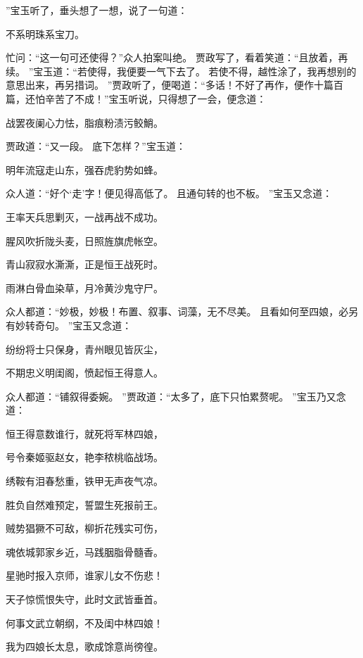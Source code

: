 ”宝玉听了，垂头想了一想，说了一句道：\par
\hop
不系明珠系宝刀。
\par
\hop
忙问：“这一句可还使得？”众人拍案叫绝。
贾政写了，看着笑道：“且放着，再续。
”宝玉道：“若使得，我便要一气下去了。
若使不得，越性涂了，我再想别的意思出来，再另措词。
”贾政听了，便喝道：“多话！不好了再作，便作十篇百篇，还怕辛苦了不成！”宝玉听说，只得想了一会，便念道：\par
\hop
战罢夜阑心力怯，脂痕粉渍污鲛鮹。
\par
\hop
贾政道：“又一段。
底下怎样？”宝玉道：\par
\hop
明年流寇走山东，强吞虎豹势如蜂。
\par
\hop
众人道：“好个‘走’字！便见得高低了。
且通句转的也不板。
”宝玉又念道：\par
\hop
王率天兵思剿灭，一战再战不成功。
\par
腥风吹折陇头麦，日照旌旗虎帐空。
\par
青山寂寂水澌澌，正是恒王战死时。
\par
雨淋白骨血染草，月冷黄沙鬼守尸。
\par
\hop
众人都道：“妙极，妙极！布置、叙事、词藻，无不尽美。
且看如何至四娘，必另有妙转奇句。
”宝玉又念道：\par
\hop
纷纷将士只保身，青州眼见皆灰尘，\par
不期忠义明闺阁，愤起恒王得意人。
\par
\hop
众人都道：“铺叙得委婉。
”贾政道：“太多了，底下只怕累赘呢。
”宝玉乃又念道：\par
\hop
恒王得意数谁行，就死将军林四娘，\par
号令秦姬驱赵女，艳李秾桃临战场。
\par
绣鞍有泪春愁重，铁甲无声夜气凉。
\par
胜负自然难预定，誓盟生死报前王。
\par
贼势猖獗不可敌，柳折花残实可伤，\par
魂依城郭家乡近，马践胭脂骨髓香。
\par
星驰时报入京师，谁家儿女不伤悲！\par
天子惊慌恨失守，此时文武皆垂首。
\par
何事文武立朝纲，不及闺中林四娘！\par
我为四娘长太息，歌成馀意尚徬徨。
